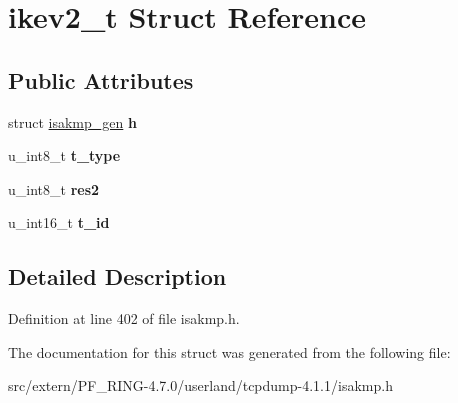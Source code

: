 \hypertarget{structikev2__t}{
\section{ikev2\_\-t Struct Reference}
\label{structikev2__t}
}
\subsection*{Public Attributes}
\begin{DoxyCompactItemize}
\item 
\hypertarget{structikev2__t_a8e11a98415bd99556a76a262ba01b78a}{
struct \hyperlink{structisakmp__gen}{isakmp\_\-gen} {\bfseries h}}
\label{structikev2__t_a8e11a98415bd99556a76a262ba01b78a}

\item 
\hypertarget{structikev2__t_a1ed9478c2debc453d084cc1a5c8b51c7}{
u\_\-int8\_\-t {\bfseries t\_\-type}}
\label{structikev2__t_a1ed9478c2debc453d084cc1a5c8b51c7}

\item 
\hypertarget{structikev2__t_a057a9f9e9bdcb93943688506e534348b}{
u\_\-int8\_\-t {\bfseries res2}}
\label{structikev2__t_a057a9f9e9bdcb93943688506e534348b}

\item 
\hypertarget{structikev2__t_a363c11be2fcd0d38519973c1440ddc23}{
u\_\-int16\_\-t {\bfseries t\_\-id}}
\label{structikev2__t_a363c11be2fcd0d38519973c1440ddc23}

\end{DoxyCompactItemize}


\subsection{Detailed Description}


Definition at line 402 of file isakmp.h.



The documentation for this struct was generated from the following file:\begin{DoxyCompactItemize}
\item 
src/extern/PF\_\-RING-\/4.7.0/userland/tcpdump-\/4.1.1/isakmp.h\end{DoxyCompactItemize}
